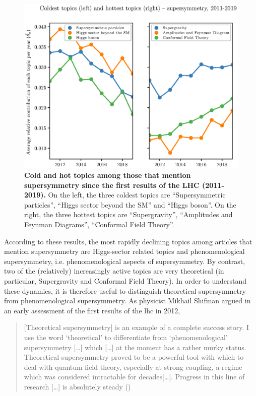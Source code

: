 \documentclass[smallextended]{svjour3}
\begin{document}
\begin{figure}
    \centering
    \includegraphics{Fig5.eps}
    \caption{\textbf{Cold and hot topics among those that mention supersymmetry since the first results of the LHC (2011-2019).} On the left, the three coldest topics are ``Supersymmetric particles'', ``Higgs sector beyond the SM'' and ``Higgs boson''. On the right, the three hottest topics are ``Supergravity'', ``Amplitudes and Feynman Diagrams'', ``Conformal Field Theory''.}
    \label{fig:hot_cold_topics_hep_2011_2019_susy}
\end{figure}

According to these results, the most rapidly declining topics among articles that mention supersymmetry are Higgs-sector related topics and phenomenological supersymmetry, i.e. phenomenological aspects of supersymmetry. By contrast, two of the (relatively) increasingly active topics are very theoretical (in particular, Supergravity and Conformal Field Theory). 
In order to understand these dynamics, it is therefore useful to distinguish theoretical supersymmetry from phenomenological supersymmetry. As physicist Mikhail Shifman argued in an early assessment of the first results of the \gls{lhc} in 2012, 

\begin{quote}
    [Theoretical supersymmetry] is an example of a complete success story. I use the word ‘theoretical’ to differentiate from ‘phenomenological’ supersymmetry [\dots] which [\dots] at the moment has a rather murky status. Theoretical supersymmetry proved to be a powerful tool with which to deal with quantum field theory, especially at strong coupling, a regime which was considered intractable for decades[\dots]. Progress in this line of research [\dots] is absolutely steady (\citealt[p.~6]{SHIFMAN2012})
\end{quote}
\end{document}
